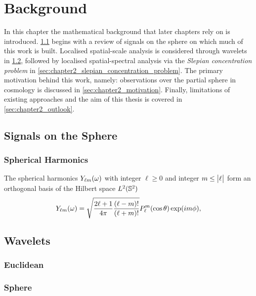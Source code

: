 \chapter{Background}\label{sec:chapter2}

In this chapter the mathematical background that later chapters rely on is introduced.
\cref{sec:chapter2_signals_sphere} begins with a review of signals on the sphere on which much of this work is built.
Localised spatial-scale analysis is considered through wavelets in \cref{sec:chapter2_wavelets}, followed by localised spatial-spectral analysis via the \emph{Slepian concentration problem} in \cref{sec:chapter2_slepian_concentration_problem}.
The primary motivation behind this work, namely: observations over the partial sphere in cosmology is discussed in \cref{sec:chapter2_motivation}.
Finally, limitations of existing approaches and the aim of this thesis is covered in \cref{sec:chapter2_outlook}.

\section{Signals on the Sphere}\label{sec:chapter2_signals_sphere}

\subsection{Spherical Harmonics}

The spherical harmonics \({Y}_{\ell m}(\omega)\) with integer \(\ell \geq 0\) and integer \(m \leq \big\lvert\ell\big\rvert\) form an orthogonal basis of the Hilbert space \(L^{2}(\mathbb{S}^{2})\)
%
\begin{equation}
	{Y}_{\ell m}(\omega)
	= \sqrt{\frac{2\ell+1}{4\pi} \frac{(\ell-m)!}{(\ell+m)!}} P^{m}_{\ell}(\cos{\theta}) \exp(i m\phi),
\end{equation}



\section{Wavelets}\label{sec:chapter2_wavelets}

\subsection{Euclidean}

\subsection{Sphere}

